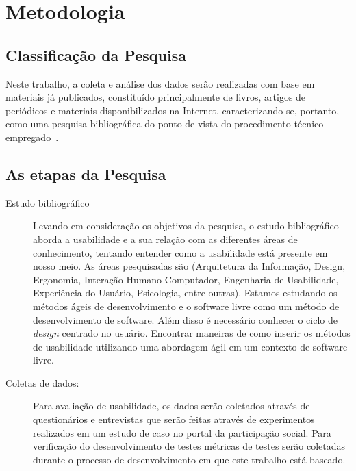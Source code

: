 \section{Metodologia}

\subsection{Classificação da Pesquisa}

Neste trabalho, a coleta e análise dos dados serão realizadas com base em  materiais já publicados, constituído principalmente de livros, artigos de periódicos e  materiais disponibilizados na Internet, caracterizando-se, portanto, como uma pesquisa bibliográfica do ponto de vista do procedimento técnico empregado~\cite{gil1991}.


\subsection{As etapas da Pesquisa}

\begin{description}
\item[Estudo bibliográfico]
%
Levando em consideração os objetivos da pesquisa, o estudo bibliográfico aborda a usabilidade e a sua relação com as diferentes áreas de conhecimento, tentando entender como a usabilidade está presente em nosso meio. As áreas pesquisadas são (Arquitetura da Informação, Design, Ergonomia, Interação Humano Computador, Engenharia de Usabilidade, Experiência do Usuário, Psicologia, entre outras).
%
Estamos estudando os métodos ágeis de desenvolvimento e o software livre como um método de desenvolvimento de software.
%
Além disso é necessário conhecer o ciclo de \emph{design} centrado no usuário. Encontrar maneiras de como inserir os métodos de usabilidade utilizando uma abordagem ágil em um contexto de software livre. 



\item[Coletas de dados:]
%
Para avaliação de usabilidade, os dados serão coletados através de questionários e entrevistas que serão feitas através de experimentos realizados em um estudo de caso no portal da participação social.
Para verificação do desenvolvimento de testes métricas de testes serão coletadas durante o processo de desenvolvimento em que este trabalho está baseado.


\end{description}

